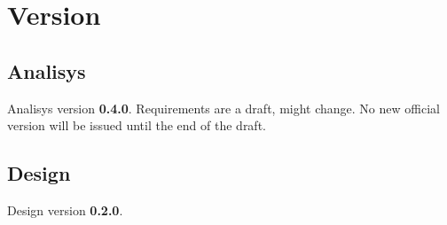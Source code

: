 \section{Version}

\subsection{Analisys}
Analisys version \textbf{0.4.0}. Requirements are a draft, might change. No new official version will be issued until the end of the draft. 

\subsection{Design}
Design version \textbf{0.2.0}.
